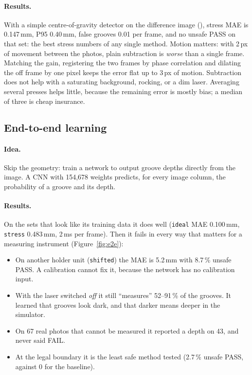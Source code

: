 \paragraph{Results.} With a simple centre-of-gravity detector on the difference image (), stress
MAE is 0.147\,mm, P95 0.40\,mm, false grooves 0.01 per frame, and no unsafe PASS on that set: the best
stress numbers of any single method. Motion matters: with 2\,px of movement between the photos, plain
subtraction is \emph{worse} than a single frame. Matching the gain, registering the two frames by phase correlation
and dilating the off frame by one pixel keeps the error flat up to 3\,px of motion. Subtraction does not help with a
saturating background, rocking, or a dim laser. Averaging several presses helps little, because the remaining
error is mostly bias; a median of three is cheap insurance.


\subsection{End-to-end learning}\label{sec:e2e}

\paragraph{Idea.} Skip the geometry: train a network to output groove depths directly from the image. A CNN with
154{,}678 weights predicts, for every image column, the probability of a groove and its depth.

\paragraph{Results.} On the sets that look like its training data it does well (\texttt{ideal} MAE 0.100\,mm,
\texttt{stress} 0.483\,mm, 2\,ms per frame). Then it fails in every way that matters for a measuring instrument
(Figure~\ref{fig:e2e}):
\begin{itemize}
\item On another holder unit (\texttt{shifted}) the MAE is 5.2\,mm with 8.7\,\% unsafe PASS. A calibration cannot
      fix it, because the network has no calibration input.
\item With the laser switched \emph{off} it still ``measures'' 52--91\,\% of the grooves. It learned that grooves look
      dark, and that darker means deeper in the simulator.
\item On 67 real photos that cannot be measured it reported a depth on 43, and never said FAIL.
\item At the legal boundary it is the least safe method tested (2.7\,\% unsafe PASS, against 0 for the baseline).
\end{itemize}

